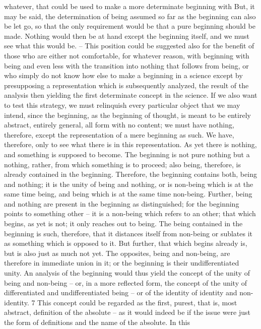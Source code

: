 whatever, that could be used to make a more determinate beginning with
But, it may be said, the determination of being assumed so far as the
beginning can also be let go, so that the only requirement would be that a
pure beginning should be made. Nothing would then be at hand except the
beginning itself, and we must see what this would be. – This position could
be suggested also for the benefit of those who are either not comfortable,
for whatever reason, with beginning with being and even less with the
transition into nothing that follows from being, or who simply do not
know how else to make a beginning in a science except by presupposing
a representation which is subsequently analyzed, the result of the analysis
then yielding the first determinate concept in the science. If we also want
to test this strategy, we must relinquish every particular object that we may
intend, since the beginning, as the beginning of thought, is meant to be
entirely abstract, entirely general, all form with no content; we must have
nothing, therefore, except the representation of a mere beginning as such.
We have, therefore, only to see what there is in this representation.
As yet there is nothing, and something is supposed to become. The
beginning is not pure nothing but a nothing, rather, from which something
is to proceed; also being, therefore, is already contained in the beginning.
Therefore, the beginning contains both, being and nothing; it is the unity
of being and nothing, or is non-being which is at the same time being, and
being which is at the same time non-being.
Further, being and nothing are present in the beginning as distinguished;
for the beginning points to something other – it is a non-being which refers
to an other; that which begins, as yet is not; it only reaches out to being.
The being contained in the beginning is such, therefore, that it distances
itself from non-being or sublates it as something which is opposed to it.
But further, that which begins already is, but is also just as much not yet.
The opposites, being and non-being, are therefore in immediate union in
it; or the beginning is their undifferentiated unity.
An analysis of the beginning would thus yield the concept of the unity of
being and non-being – or, in a more reflected form, the concept of the unity
of differentiated and undifferentiated being – or of the identity of identity
and non-identity. 7 This concept could be regarded as the first, purest, that
is, most abstract, definition of the absolute – as it would indeed be if the
issue were just the form of definitions and the name of the absolute. In this
